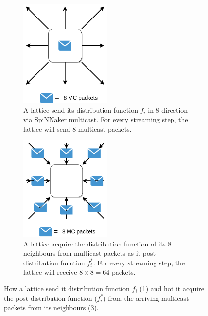 \begin{figure}[!tb]

\begin{subfigure}[b]{0.5\textwidth}
       \centering
       \includegraphics[width=0.5\textwidth]{figures/send.png}
       \caption{A lattice send its distribution function $f_i$ in 8 direction via SpiNNaker multicast. For every streaming step, the lattice will send 8 multicast packets.}
       \label{fig:spinn_send}
   \end{subfigure}
   \begin{subfigure}[b]{0.5\textwidth}
   \centering
       \includegraphics[width=0.5\textwidth]{figures/receive.png}
       \caption{A lattice acquire the distribution function of its 8 neighbours from multicast packets as it post distribution function $f_i^{*}$. For every streaming step, the lattice will receive $8\times8=64$ packets.}
       \label{fig:spinn_receive}
   \end{subfigure}
   \caption{How a lattice send it distribution function $f_i$ (\ref{fig:spinn_send}) and hot it acquire the post distribution function ($f_i^{*}$) from the arriving multicast packets from its neighbours (\ref{fig:spinn_receive}).}
\end{figure}

